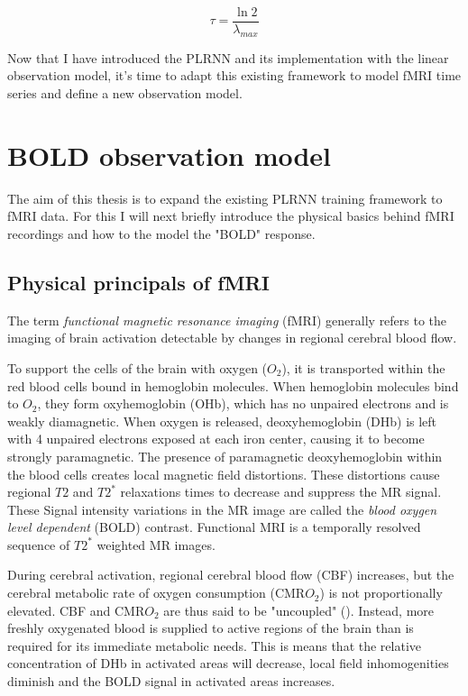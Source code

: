 \begin{equation}
    \tau = \frac{\ln 2}{\lambda_{max}}
\end{equation}

Now that I have introduced the PLRNN and its implementation with the linear observation model, it's time to adapt this existing framework to model fMRI time series and 
define a new observation model.

\section{BOLD observation model} \label{sec:bold_obs}

The aim of this thesis is to expand the existing PLRNN training framework to fMRI data. For this I will next briefly introduce the physical basics behind fMRI recordings 
and how to the model the "BOLD" response.

\subsection{Physical principals of fMRI}

The term \textit{functional magnetic resonance imaging} (fMRI) generally refers to the imaging of brain activation detectable by changes in regional cerebral blood flow.

To support the cells of the brain with oxygen ($O_2$), it is transported within the red blood cells bound in hemoglobin molecules. When hemoglobin molecules bind to $O_2$, they 
form oxyhemoglobin (OHb), which has no unpaired electrons and is weakly diamagnetic. When oxygen is released, deoxyhemoglobin (DHb) is left with 4 unpaired electrons
exposed at each iron center, causing it to become strongly paramagnetic. The presence of paramagnetic deoxyhemoglobin within the blood cells creates local magnetic field 
distortions. These distortions cause regional $T2$ and $T2^*$ relaxations times to decrease and suppress the MR signal.
These Signal intensity variations in the MR image are called the \textit{blood oxygen level dependent} (BOLD) contrast. Functional MRI is a temporally resolved sequence of
$T2^*$ weighted MR images.

During cerebral activation, regional cerebral blood flow (CBF) increases, but the cerebral metabolic rate of oxygen consumption (CMR$O_2$) is not proportionally elevated.
CBF and CMR$O_2$ are thus said to be "uncoupled" (\cite{fox2012coupling}). Instead, more freshly oxygenated blood is supplied to active regions of the brain than is required
for its immediate metabolic needs. This is means that the relative concentration of DHb in activated areas will decrease, local field inhomogenities diminish and the 
BOLD signal in activated areas increases.

